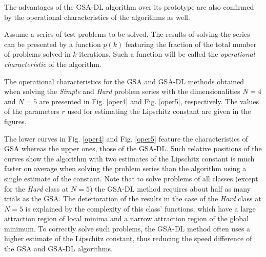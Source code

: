 \documentclass[runningheads]{llncs}
\begin{document}
The advantages of the GSA-DL algorithm over its prototype are also confirmed by the operational characteristics of the algorithms as well. 

Assume a series of test problems to be solved. The results of solving the series can be presented by a function $p(k)$ featuring the fraction of the total number of problems solved in $k$ iterations. Such a function will be called the \textit{operational characteristic} of the algorithm. 

The operational characteristics for the GSA and GSA-DL methods obtained when solving the \textit{Simple} and \textit{Hard} problem series with the dimensionalities $N=4$ and $N=5$ are presented in Fig. \ref{oper4} and Fig. \ref{oper5}, respectively. The values of the parameters $r$ used for estimating the Lipschitz constant are given in the figures.

The lower curves in Fig. \ref{oper4} and Fig. \ref{oper5} feature the characteristics of GSA whereas the upper ones, those of the GSA-DL. Such relative positions of the curves show the algorithm with two estimates of the Lipschitz constant is much faster on average when solving the problem series than the algorithm using a single estimate of the constant.
Note that to solve problems of all classes (except for the \textit{Hard} class at $N=5$) the GSA-DL method requires about half as many trials as the GSA. The deterioration of the results in the case of the \textit{Hard} class at $N=5$ is explained by the complexity of this class' functions, which have a large attraction region of local minima and a narrow attraction region of the global minimum. To correctly solve such problems, the GSA-DL method often uses a higher estimate of the Lipschitz constant, thus reducing the speed difference of the GSA and GSA-DL algorithms.

%




\end{document}
